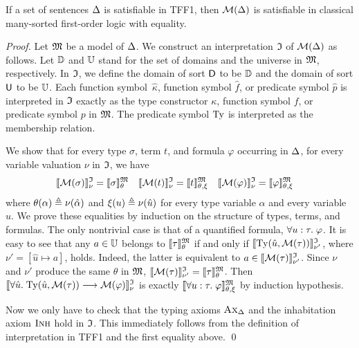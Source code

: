 \begin{theorem}%
\label{thm:mon_sound}%
\afterDot
If a set of sentences $\mathrm{\Delta}$ is satisfiable in TFF1,
then $\mathcal{M}(\mathrm{\Delta})$ is satisfiable in classical
many-sorted first-order logic with equality.
\end{theorem}
\begin{proof}
Let $\mathfrak{M}$ be a model of $\mathrm{\Delta}$.
We construct an interpretation $\mathfrak{I}$ of $\mathcal{M}(\mathrm{\Delta})$ as follows.
Let $\mathbb{D}$ and $\mathbb{U}$ stand for
the set of domains and the universe in $\mathfrak{M}$, respectively.
In $\mathfrak{I}$, we define the domain of sort $\mathsf{D}$ to be $\mathbb{D}$
and the domain of sort $\mathsf{U}$ to be $\mathbb{U}$.
Each function symbol~$\hat{\kappa}$, function symbol $\hat{f}$,
or predicate symbol $\hat{p}$ is interpreted in $\mathfrak{I}$
exactly as the type constructor $\kappa$, function symbol $f$,
or predicate symbol $p$ in $\mathfrak{M}$.
The predicate symbol $\mathrm{Ty}$ is interpreted as the membership relation.

We show that for every type $\sigma$, term $t$,
and formula $\varphi$ occurring in $\mathrm{\Delta}$,
for every variable valuation $\nu$ in $\mathfrak{I}$, we have
\begin{align*}
\llbracket \mathcal{M}(\sigma) \rrbracket^{\mathfrak{I}}_{\nu} &= \llbracket \sigma \rrbracket^{\mathfrak{M}}_{\theta} &
\llbracket \mathcal{M}(t) \rrbracket^{\mathfrak{I}}_{\nu} &= \llbracket t \rrbracket^{\mathfrak{M}}_{\theta,\xi} &
\llbracket \mathcal{M}(\varphi) \rrbracket^{\mathfrak{I}}_{\nu} &= \llbracket \varphi \rrbracket^{\mathfrak{M}}_{\theta,\xi}
\end{align*}
where $\theta(\alpha) \mathrel{\triangleq} \nu(\hat{\alpha})$ and
$\xi(u) \mathrel{\triangleq} \nu(\hat{u})$ for every
type variable $\alpha$ and every variable $u$.
%
We prove these equalities by induction on the structure
of types, terms, and formulas. The only nontrivial case is
that of a quantified formula, $\forall u \mathrel{:} \tau .\; \varphi$.
It is easy to see that any $a \in \mathbb{U}$ belongs
to $\llbracket \tau \rrbracket^{\mathfrak{M}}_\theta$ if and only if
$\llbracket \mathrm{Ty}(\hat{u},\mathcal{M}(\tau)) \rrbracket^{\mathfrak{I}}_{\nu'}{}_{\vphantom{]}}$,
where $\nu' = [\hat{u} \mapsto a]$, holds. Indeed, the latter is equivalent to
$a \in \llbracket \mathcal{M}(\tau) \rrbracket^{\mathfrak{I}}_{\nu'}$.
Since $\nu$ and $\nu'$ produce the same
$\theta$ in $\mathfrak{M}$,
$\llbracket \mathcal{M}(\tau) \rrbracket^{\mathfrak{I}}_{\nu'} = \llbracket \tau \rrbracket^{\mathfrak{M}}_\theta$.
Then
$\llbracket \forall \hat{u} .\; \mathrm{Ty}(\hat{u},\mathcal{M}(\tau))
\longrightarrow \mathcal{M}(\varphi) \rrbracket^{\mathfrak{I}}_{\nu}$ is exactly
$\llbracket \forall u \mathrel{:} \tau .\; \varphi \rrbracket^{\mathfrak{M}}_{\theta,\xi}$
by induction hypothesis.

Now we only have to check that the typing axioms
$\text{\sc Ax}_{\mathrm{\Delta}}$ and the inhabitation axiom $\text{\sc Inh}$ hold in $\mathfrak{I}$.
This immediately follows from the definition of
interpretation in TFF1 and the first equality above.
\qed
\end{proof}

